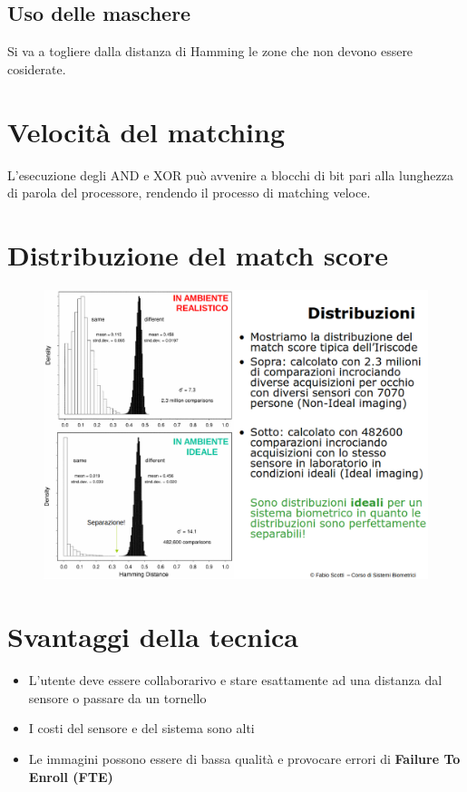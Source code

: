 \documentclass{report}
\begin{document}
\subsection{Uso delle maschere}

Si va a togliere dalla distanza di Hamming le zone che non 
devono essere cosiderate.

\section{Velocità del matching}
L'esecuzione degli AND e XOR può avvenire a blocchi di bit pari 
alla lunghezza di parola del processore, rendendo il processo 
di matching veloce.

\newpage
\section{Distribuzione del match score}

\begin{figure}[ht]
    \centering
    \includegraphics[width=1\linewidth]{images/distr-match-score.png}
\end{figure}

\newpage
\section{Svantaggi della tecnica}
\begin{itemize}
    \item L'utente deve essere collaborarivo e stare esattamente ad una 
    distanza dal sensore o passare da un tornello 
    \item I costi del sensore e del sistema sono alti 
    \item Le immagini possono essere di bassa qualità e provocare errori di \textbf{Failure To Enroll (FTE)}
\end{itemize}
\end{document}
